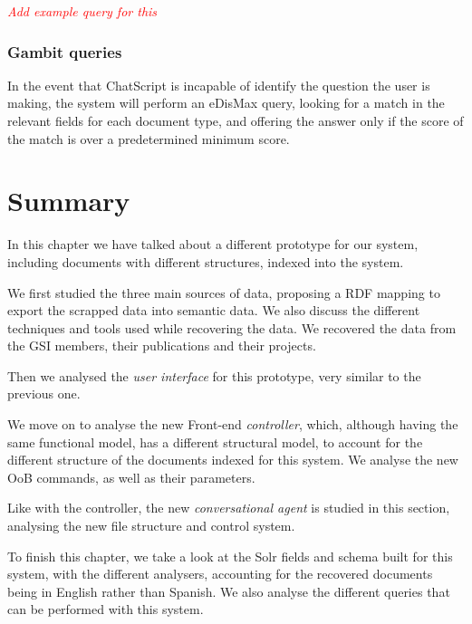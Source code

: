 \emph{\textcolor{red}{Add example query for this}}

\subsubsection{Gambit queries}

In the event that ChatScript is incapable of identify the question the user is making, the system will perform an \ac{eDisMax} query, looking for a match in the relevant fields for each document type, and offering the answer only if the score of the match is over a predetermined minimum score.

\section{Summary}

In this chapter we have talked about a different prototype for our system, including documents with different structures, indexed into the system.

We first studied the three main sources of data, proposing a RDF mapping to export the scrapped data into semantic data. We also discuss the different techniques and tools used while recovering the data. We recovered the data from the GSI members, their publications and their projects.

Then we analysed the \emph{user interface} for this prototype, very similar to the previous one.

We move on to analyse the new Front-end \emph{controller}, which, although having the same functional model, has a different structural model, to account for the different structure of the documents indexed for this system. We analyse the new \ac{OoB} commands, as well as their parameters.

Like with the controller, the new \emph{conversational agent} is studied in this section, analysing the new file structure and control system.

To finish this chapter, we take a look at the Solr fields and schema built for this system, with the different analysers, accounting for the recovered documents being in English rather than Spanish. We also analyse the different queries that can be performed with this system.